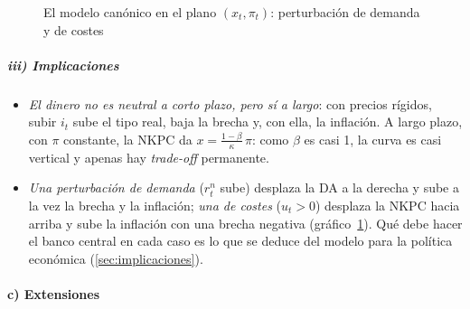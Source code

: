 \documentclass[11pt]{article}
\begin{document}
\begin{figure}[H]
\centering
\caption{El modelo canónico en el plano $(x_t,\pi_t)$: perturbación de demanda y de costes}\label{fig:nek-xpi}
\end{figure}

\subparagraph{iii) Implicaciones}

\begin{itemize}
\item \emph{El dinero no es neutral a corto plazo, pero sí a largo}: con precios rígidos, subir $i_t$ sube el tipo real, baja la brecha y, con ella, la inflación. A largo plazo, con $\pi$ constante, la NKPC da $x=\frac{1-\beta}{\kappa}\,\pi$: como $\beta$ es casi 1, la curva es casi vertical y apenas hay \emph{trade-off} permanente.
\item \emph{Una perturbación de demanda} ($r^n_t$ sube) desplaza la DA a la derecha y sube a la vez la brecha y la inflación; \emph{una de costes} ($u_t>0$) desplaza la NKPC hacia arriba y sube la inflación con una brecha negativa (gráfico~\ref{fig:nek-xpi}). Qué debe hacer el banco central en cada caso es lo que se deduce del modelo para la política económica (\ref{sec:implicaciones}).
\end{itemize}

\paragraph{c) Extensiones}
\end{document}

